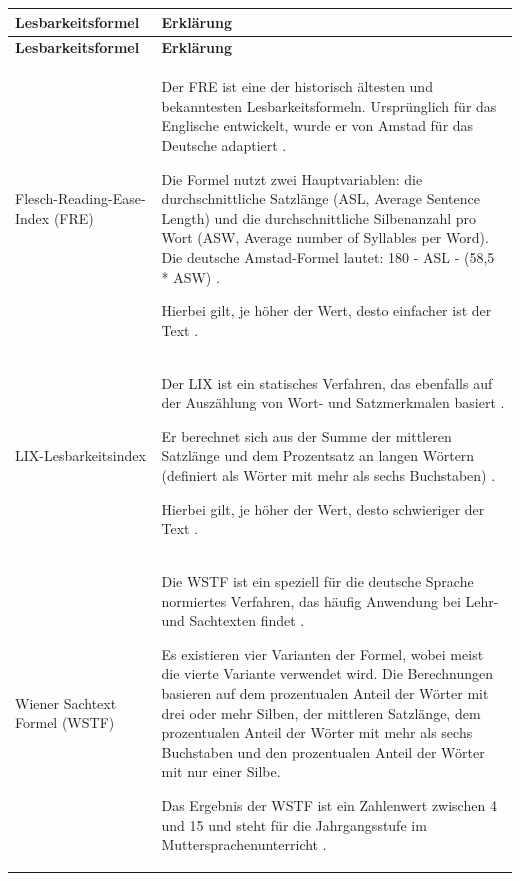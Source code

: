 \begin{longtable}{|p{}|p{}|}
	\hline
	\textbf{Lesbarkeitsformel} & \textbf{Erklärung}\\
	\hline
	\endfirsthead
	
	\hline
	\textbf{Lesbarkeitsformel} & \textbf{Erklärung}\\
	\hline
	\endhead
	
	Flesch-Reading-Ease-Index (FRE) & 
	Der FRE ist eine der historisch ältesten und bekanntesten Lesbarkeitsformeln. Ursprünglich für das Englische entwickelt, wurde er von Amstad für das Deutsche adaptiert \cite[S. 166]{maas_handbuch_2018}.
	
	Die Formel nutzt zwei Hauptvariablen: die durchschnittliche Satzlänge (ASL, Average Sentence Length) und die durchschnittliche Silbenanzahl pro Wort (ASW, Average number of Syllables per Word). Die deutsche Amstad-Formel lautet: 180 - ASL - (58,5 * ASW) \cite[S. 166]{maas_handbuch_2018}.
	
	Hierbei gilt, je höher der Wert, desto einfacher ist der Text \cite[S. 443]{pedrini_medical_2024}.\\
	\hline
	
	LIX-Lesbarkeitsindex & 
	Der LIX ist ein statisches Verfahren, das ebenfalls auf der Auszählung von Wort- und Satzmerkmalen basiert \cite[S. 442]{pedrini_medical_2024}.
	
	Er berechnet sich aus der Summe der mittleren Satzlänge und dem Prozentsatz an langen Wörtern (definiert als Wörter mit mehr als sechs Buchstaben) \cite[S. 442]{pedrini_medical_2024}.
	
	Hierbei gilt, je höher der Wert, desto schwieriger der Text \cite[S. 443]{pedrini_medical_2024}.\\
	\hline
	
	Wiener Sachtext Formel (WSTF) & 
	Die WSTF ist ein speziell für die deutsche Sprache normiertes Verfahren, das häufig Anwendung bei Lehr- und Sachtexten findet  \cite[S. 22-24]{Wisse2015}.
	
	Es existieren vier Varianten der Formel, wobei meist die vierte Variante verwendet wird.
	Die Berechnungen basieren auf dem prozentualen Anteil der Wörter mit drei oder mehr Silben, der mittleren Satzlänge, dem prozentualen Anteil der Wörter mit mehr als sechs Buchstaben und den prozentualen Anteil der Wörter mit nur einer Silbe.
	
	Das Ergebnis der WSTF ist ein Zahlenwert zwischen 4 und 15 und steht für die Jahrgangsstufe im Muttersprachenunterricht \cite[S. 22-24]{Wisse2015}.\\
	\hline
	

\end{longtable}
